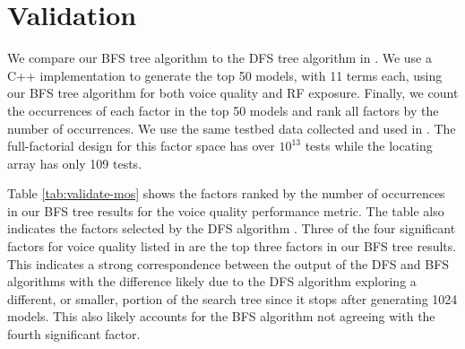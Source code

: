 \section{Validation} \label{sect:validation}

We compare our BFS tree algorithm to the DFS tree algorithm in \cite{Compton-et-al-LA}.
We use a C++ implementation to generate the top 50 models, with 11 terms each, using our BFS tree algorithm for both voice quality and RF exposure. 
Finally, we count the occurrences of each factor in the top 50 models and rank all factors by the number of occurrences. 
We use the same testbed data collected and used in \cite{Compton-et-al-LA}.
The full-factorial design for this factor space has over $10^{13}$ tests while the locating array has only 109 tests.

Table \ref{tab:validate-mos} shows the factors ranked by the number of occurrences in our BFS tree results for the voice quality performance metric.
The table also indicates the factors selected by the DFS algorithm \cite{Compton-et-al-LA}.
Three of the four significant factors for voice quality listed in \cite{Compton-et-al-LA} are the top three factors in our BFS tree results. 
This indicates a strong correspondence between the output of the DFS and BFS algorithms with the difference likely due to the DFS algorithm exploring a different, or smaller, portion of the search tree since it stops after generating 1024 models.
This also likely accounts for the BFS algorithm not agreeing with the fourth significant factor.

